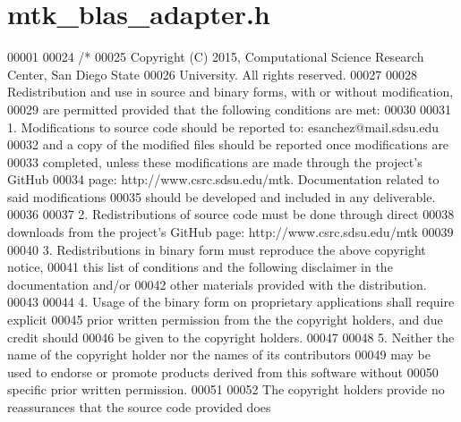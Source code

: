 \hypertarget{mtk__blas__adapter_8h_source}{\section{mtk\+\_\+blas\+\_\+adapter.\+h}
\label{mtk__blas__adapter_8h_source}
}

\begin{DoxyCode}
00001 
00024 \textcolor{comment}{/*}
00025 \textcolor{comment}{Copyright (C) 2015, Computational Science Research Center, San Diego State}
00026 \textcolor{comment}{University. All rights reserved.}
00027 \textcolor{comment}{}
00028 \textcolor{comment}{Redistribution and use in source and binary forms, with or without modification,}
00029 \textcolor{comment}{are permitted provided that the following conditions are met:}
00030 \textcolor{comment}{}
00031 \textcolor{comment}{1. Modifications to source code should be reported to: esanchez@mail.sdsu.edu}
00032 \textcolor{comment}{and a copy of the modified files should be reported once modifications are}
00033 \textcolor{comment}{completed, unless these modifications are made through the project's GitHub}
00034 \textcolor{comment}{page: http://www.csrc.sdsu.edu/mtk. Documentation related to said modifications}
00035 \textcolor{comment}{should be developed and included in any deliverable.}
00036 \textcolor{comment}{}
00037 \textcolor{comment}{2. Redistributions of source code must be done through direct}
00038 \textcolor{comment}{downloads from the project's GitHub page: http://www.csrc.sdsu.edu/mtk}
00039 \textcolor{comment}{}
00040 \textcolor{comment}{3. Redistributions in binary form must reproduce the above copyright notice,}
00041 \textcolor{comment}{this list of conditions and the following disclaimer in the documentation and/or}
00042 \textcolor{comment}{other materials provided with the distribution.}
00043 \textcolor{comment}{}
00044 \textcolor{comment}{4. Usage of the binary form on proprietary applications shall require explicit}
00045 \textcolor{comment}{prior written permission from the the copyright holders, and due credit should}
00046 \textcolor{comment}{be given to the copyright holders.}
00047 \textcolor{comment}{}
00048 \textcolor{comment}{5. Neither the name of the copyright holder nor the names of its contributors}
00049 \textcolor{comment}{may be used to endorse or promote products derived from this software without}
00050 \textcolor{comment}{specific prior written permission.}
00051 \textcolor{comment}{}
00052 \textcolor{comment}{The copyright holders provide no reassurances that the source code provided does}

\end{DoxyCode}
